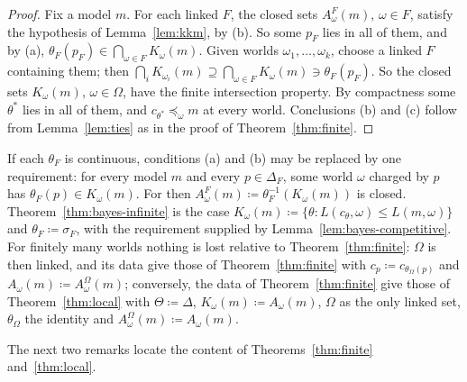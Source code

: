 \documentclass[11pt]{article}
\theoremstyle{definition}
\theoremstyle{remark}
\begin{document}
\begin{proof}
Fix a model $m$. For each linked $F$, the closed sets $A^F_\omega(m)$, $\omega\in F$, satisfy the hypothesis of Lemma~\ref{lem:kkm}, by (b). So some $p_F$ lies in all of them, and by (a), $\theta_F(p_F)\in\bigcap_{\omega\in F}K_\omega(m)$. Given worlds $\omega_1,\dots,\omega_k$, choose a linked $F$ containing them; then $\bigcap_iK_{\omega_i}(m)\supseteq\bigcap_{\omega\in F}K_\omega(m)\ni\theta_F(p_F)$. So the closed sets $K_\omega(m)$, $\omega\in\Omega$, have the finite intersection property. By compactness some $\theta^*$ lies in all of them, and $c_{\theta^*}\preceq_\omega m$ at every world. Conclusions (b) and (c) follow from Lemma~\ref{lem:ties} as in the proof of Theorem~\ref{thm:finite}.
\end{proof}

If each $\theta_F$ is continuous, conditions (a) and (b) may be replaced by one requirement: for every model $m$ and every $p\in\Delta_F$, some world $\omega$ charged by $p$ has $\theta_F(p)\in K_\omega(m)$. For then $A^F_\omega(m)\coloneqq\theta_F^{-1}(K_\omega(m))$ is closed. Theorem~\ref{thm:bayes-infinite} is the case $K_\omega(m)\coloneqq\{\theta:L(c_\theta,\omega)\le L(m,\omega)\}$ and $\theta_F\coloneqq\sigma_F$, with the requirement supplied by Lemma~\ref{lem:bayes-competitive}. For finitely many worlds nothing is lost relative to Theorem~\ref{thm:finite}: $\Omega$ is then linked, and its data give those of Theorem~\ref{thm:finite} with $c_p\coloneqq c_{\theta_\Omega(p)}$ and $A_\omega(m)\coloneqq A^\Omega_\omega(m)$; conversely, the data of Theorem~\ref{thm:finite} give those of Theorem~\ref{thm:local} with $\Theta\coloneqq\Delta$, $K_\omega(m)\coloneqq A_\omega(m)$, $\Omega$ as the only linked set, $\theta_\Omega$ the identity and $A^\Omega_\omega(m)\coloneqq A_\omega(m)$.

The next two remarks locate the content of Theorems~\ref{thm:finite} and~\ref{thm:local}.
\end{document}
